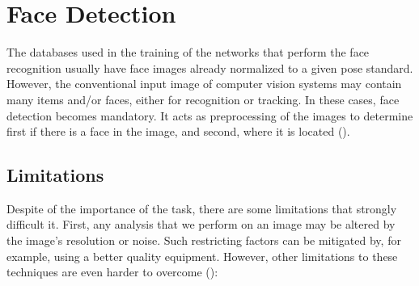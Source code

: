                                                                                       

\section{Face Detection}
The databases used in the training of the networks that perform the face recognition usually have face images already normalized  to  a  given  pose  standard. However,  the  conventional  input  image  of  computer  vision  systems  may  contain many items and/or faces, either for recognition or tracking. In these cases, face detection becomes mandatory. It acts as preprocessing of the images to determine first
if there is a face in the image, and second, where it is located (\cite{marques2010face}).

	\subsection{Limitations}
	Despite of the importance of the task, there are some limitations that strongly difficult it. First, any analysis that we perform on an image may be altered by the image’s resolution or noise. Such restricting factors can be mitigated by, for example, using a better quality equipment. However, other limitations to these techniques are even harder to overcome (\cite{yang2002detecting}):

